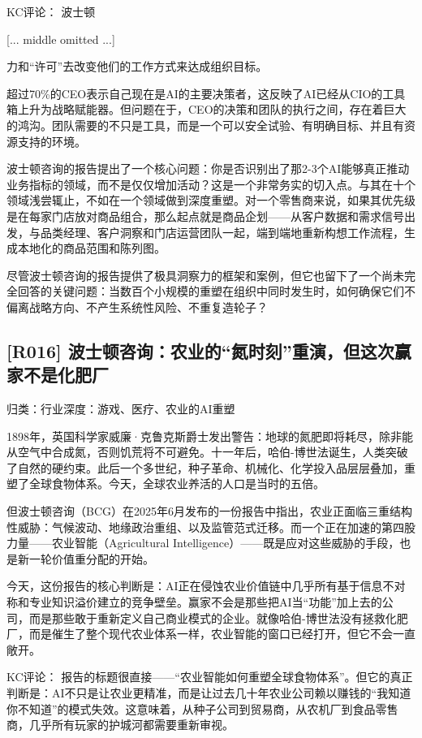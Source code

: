 \documentclass[11pt]{ctexart}
\begin{document}
KC评论： 波士顿

[... middle omitted ...]

力和“许可”去改变他们的工作方式来达成组织目标。

超过70\%的CEO表示自己现在是AI的主要决策者，这反映了AI已经从CIO的工具箱上升为战略赋能器。但问题在于，CEO的决策和团队的执行之间，存在着巨大的鸿沟。团队需要的不只是工具，而是一个可以安全试验、有明确目标、并且有资源支持的环境。

波士顿咨询的报告提出了一个核心问题：你是否识别出了那2-3个AI能够真正推动业务指标的领域，而不是仅仅增加活动？这是一个非常务实的切入点。与其在十个领域浅尝辄止，不如在一个领域做到深度重塑。对一个零售商来说，如果其优先级是在每家门店放对商品组合，那么起点就是商品企划——从客户数据和需求信号出发，与品类经理、客户洞察和门店运营团队一起，端到端地重新构想工作流程，生成本地化的商品范围和陈列图。

尽管波士顿咨询的报告提供了极具洞察力的框架和案例，但它也留下了一个尚未完全回答的关键问题：当数百个小规模的重塑在组织中同时发生时，如何确保它们不偏离战略方向、不产生系统性风险、不重复造轮子？

\subsection{[R016] 波士顿咨询：农业的“氮时刻”重演，但这次赢家不是化肥厂}
{\small\color{refgray}归类：行业深度：游戏、医疗、农业的AI重塑}

1898年，英国科学家威廉·克鲁克斯爵士发出警告：地球的氮肥即将耗尽，除非能从空气中合成氮，否则饥荒将不可避免。十一年后，哈伯-博世法诞生，人类突破了自然的硬约束。此后一个多世纪，种子革命、机械化、化学投入品层层叠加，重塑了全球食物体系。今天，全球农业养活的人口是当时的五倍。

但波士顿咨询（BCG）在2025年6月发布的一份报告中指出，农业正面临三重结构性威胁：气候波动、地缘政治重组、以及监管范式迁移。而一个正在加速的第四股力量——农业智能（Agricultural Intelligence）——既是应对这些威胁的手段，也是新一轮价值重分配的开始。

今天，这份报告的核心判断是：AI正在侵蚀农业价值链中几乎所有基于信息不对称和专业知识溢价建立的竞争壁垒。赢家不会是那些把AI当“功能”加上去的公司，而是那些敢于重新定义自己商业模式的企业。就像哈伯-博世法没有拯救化肥厂，而是催生了整个现代农业体系一样，农业智能的窗口已经打开，但它不会一直敞开。

KC评论： 报告的标题很直接——“农业智能如何重塑全球食物体系”。但它的真正判断是：AI不只是让农业更精准，而是让过去几十年农业公司赖以赚钱的“我知道你不知道”的模式失效。这意味着，从种子公司到贸易商，从农机厂到食品零售商，几乎所有玩家的护城河都需要重新审视。
\end{document}
